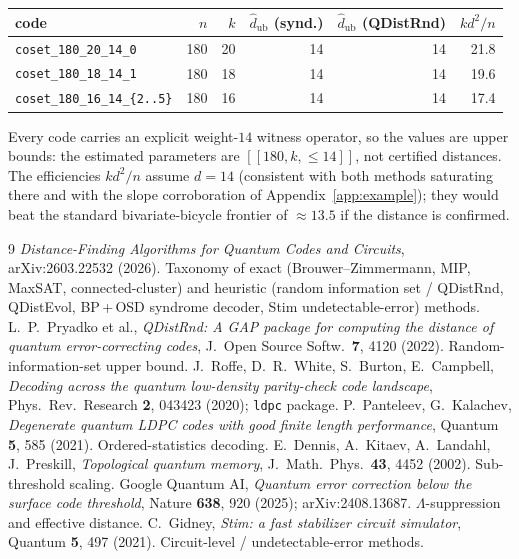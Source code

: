 \documentclass[11pt]{article}
\newcommand{\dub}{\hat d_{\mathrm{ub}}}
\begin{document}
\begin{center}
\begin{tabular}{lrrrrr}
\toprule
code & $n$ & $k$ & $\dub$ (synd.) & $\dub$ (QDistRnd) & $kd^2/n$ \\
\midrule
\texttt{coset\_180\_20\_14\_0}        & 180 & 20 & 14 & 14 & 21.8 \\
\texttt{coset\_180\_18\_14\_1}        & 180 & 18 & 14 & 14 & 19.6 \\
\texttt{coset\_180\_16\_14\_\{2..5\}} & 180 & 16 & 14 & 14 & 17.4 \\
\bottomrule
\end{tabular}
\end{center}
Every code carries an explicit weight-$14$ witness operator, so the values are
upper bounds: the estimated parameters are $[[180,k,\le 14]]$, not certified
distances. The efficiencies $kd^2/n$ assume $d=14$ (consistent with both methods
saturating there and with the slope corroboration of Appendix~\ref{app:example});
they would beat the standard bivariate-bicycle frontier of $\approx 13.5$ if the
distance is confirmed.

\begin{thebibliography}{9}
 \emph{Distance-Finding Algorithms for Quantum Codes and
Circuits}, arXiv:2603.22532 (2026). Taxonomy of exact (Brouwer--Zimmermann, MIP,
MaxSAT, connected-cluster) and heuristic (random information set / QDistRnd,
QDistEvol, BP\,+\,OSD syndrome decoder, Stim undetectable-error) methods.
 L.~P.~Pryadko et al., \emph{QDistRnd: A GAP package for
computing the distance of quantum error-correcting codes}, J.~Open Source Softw.\
\textbf{7}, 4120 (2022). Random-information-set upper bound.
 J.~Roffe, D.~R.~White, S.~Burton, E.~Campbell,
\emph{Decoding across the quantum low-density parity-check code landscape},
Phys.\ Rev.\ Research \textbf{2}, 043423 (2020); \texttt{ldpc} package.
\bibitem{PanteleevKalachev} P.~Panteleev, G.~Kalachev,
\emph{Degenerate quantum LDPC codes with good finite length performance},
Quantum \textbf{5}, 585 (2021). Ordered-statistics decoding.
 E.~Dennis, A.~Kitaev, A.~Landahl, J.~Preskill,
\emph{Topological quantum memory}, J.~Math.\ Phys.\ \textbf{43}, 4452 (2002).
Sub-threshold scaling.
 Google Quantum AI, \emph{Quantum error correction below the
surface code threshold}, Nature \textbf{638}, 920 (2025); arXiv:2408.13687.
$\Lambda$-suppression and effective distance.
 C.~Gidney, \emph{Stim: a fast stabilizer circuit simulator},
Quantum \textbf{5}, 497 (2021). Circuit-level / undetectable-error methods.
\end{thebibliography}
\end{document}
